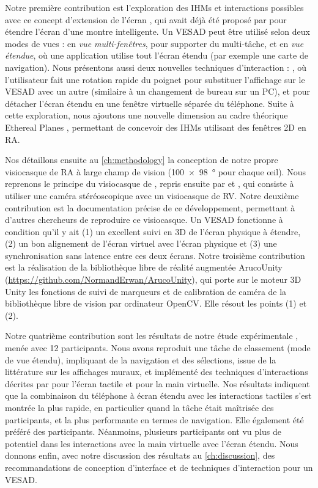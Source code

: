 Notre première contribution est l'exploration des IHMs et interactions possibles avec ce concept d'extension de l'écran , qui avait déjà été proposé par \cite{Grubert2015} pour étendre l'écran d'une montre intelligente. Un VESAD peut être utilisé selon deux modes de vues : en \emph{vue multi-fenêtres}, pour supporter du multi-tâche, et en \emph{vue étendue}, où une application utilise tout l'écran étendu (par exemple une carte de navigation). Nous présentons aussi deux nouvelles techniques d'interaction : , où l'utilisateur fait une rotation rapide du poignet pour substituer l'affichage sur le VESAD avec un autre (similaire à un changement de bureau sur un PC), et  pour détacher l'écran étendu en une fenêtre virtuelle séparée du téléphone. Suite à cette exploration, nous ajoutons une nouvelle dimension au cadre théorique Ethereal Planes \citep{Ens2014a}, permettant de concevoir des IHMs utilisant des fenêtres 2D en RA.

Nos détaillons ensuite au \autoref{ch:methodology} la conception de notre propre visiocasque de RA à large champ de vision (\SI{100x98}{\degree} pour chaque \oe il). Nous reprenons le principe du visiocasque de \cite{Steptoe2013}, repris ensuite par \cite{Steptoe2014} et \cite{Piumsomboon2014}, qui consiste à utiliser une caméra stéréoscopique  avec un visiocasque de RV. Notre deuxième contribution est la documentation précise de ce développement, permettant à d'autres chercheurs de reproduire ce visiocasque. Un VESAD fonctionne à condition qu'il y ait (1) un excellent suivi en 3D de l'écran physique à étendre, (2) un bon alignement de l'écran virtuel avec l'écran physique et (3) une synchronisation sans latence entre ces deux écrans. Notre troisième contribution est la réalisation de la bibliothèque libre de réalité augmentée ArucoUnity (\url{https://github.com/NormandErwan/ArucoUnity}), qui porte sur le moteur 3D Unity les fonctions de suivi de marqueurs et de calibration de caméra de la bibliothèque libre de vision par ordinateur OpenCV. Elle résout les points (1) et (2).

Notre quatrième contribution sont les résultats de notre étude expérimentale , menée avec 12 participants. Nous avons reproduit une tâche de classement (mode de vue étendu), impliquant de la navigation et des sélections, issue de la littérature sur les affichages muraux, et implémenté des techniques d'interactions décrites par \cite{Wobbrock2009} pour l'écran tactile et \cite{Piumsomboon2013} pour la main virtuelle. Nos résultats indiquent que la combinaison du téléphone à écran étendu avec les interactions tactiles s'est montrée la plus rapide, en particulier quand la tâche était maîtrisée des participants, et la plus performante en termes de navigation. Elle également été préféré des participants. Néanmoins, plusieurs participants ont vu plus de potentiel dans les interactions avec la main virtuelle avec l'écran étendu. Nous donnons enfin, avec notre discussion des résultats au \autoref{ch:discussion}, des recommandations de conception d'interface et de techniques d'interaction pour un VESAD.

